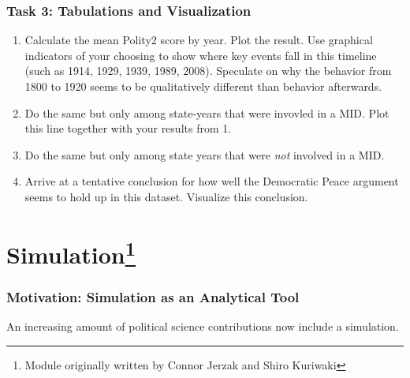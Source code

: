 \documentclass[
]{book}
\providecommand{\tightlist}{%
  \setlength{\itemsep}{0pt}\setlength{\parskip}{0pt}}
\theoremstyle{definition}
\theoremstyle{definition}
\theoremstyle{definition}
\theoremstyle{definition}
\theoremstyle{remark}
\begin{document}
\hypertarget{task-3-tabulations-and-visualization}{%
\subsection*{Task 3: Tabulations and Visualization}\label{task-3-tabulations-and-visualization}}

\begin{enumerate}
\def\labelenumi{\arabic{enumi}.}
\tightlist
\item
  Calculate the mean Polity2 score by year. Plot the result. Use graphical indicators of your choosing to show where key events fall in this timeline (such as 1914, 1929, 1939, 1989, 2008). Speculate on why the behavior from 1800 to 1920 seems to be qualitatively different than behavior afterwards.
\item
  Do the same but only among state-years that were invovled in a MID. Plot this line together with your results from 1.
\item
  Do the same but only among state years that were \emph{not} involved in a MID.
\item
  Arrive at a tentative conclusion for how well the Democratic Peace argument seems to hold up in this dataset. Visualize this conclusion.
\end{enumerate}

\hypertarget{simulation}{%
\chapter[Simulation]{\texorpdfstring{Simulation\footnote{Module originally written by Connor Jerzak and Shiro Kuriwaki}}{Simulation}}\label{simulation}}

\hypertarget{motivation-simulation-as-an-analytical-tool}{%
\subsection*{Motivation: Simulation as an Analytical Tool}\label{motivation-simulation-as-an-analytical-tool}}

An increasing amount of political science contributions now include a simulation.
\end{document}

